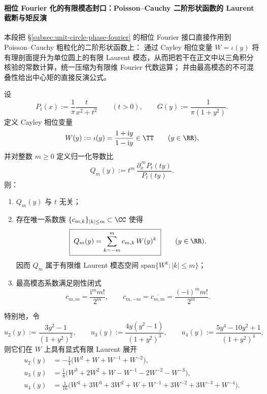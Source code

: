 \paragraph{相位 Fourier 化的有限模态封口：Poisson--Cauchy 二阶形状函数的 Laurent 截断与矩反演}\label{para:cdim-poisson-cauchy-phase-fourierization}
本段把 \S\ref{subsec:unit-circle-phase-fourier} 的相位 Fourier 接口直接作用到 Poisson--Cauchy 粗粒化的二阶形状函数上：
通过 Cayley 相位变量 \(W=\iota(y)\) 将有理剖面提升为单位圆上的有限 Laurent 模态，从而把若干在正文中以三角积分核验的常数计算，统一压缩为有限维 Fourier 代数运算；
并由最高模态的不可混叠性给出中心矩的直接反演公式。

\begin{proposition}\label{prop:cdim-poisson-cauchy-finite-laurent-modes}
设
\[
P_t(x):=\frac{1}{\pi}\frac{t}{x^2+t^2}\qquad(t>0),
\qquad
G(y):=\frac{1}{\pi(1+y^2)}.
\]
定义 Cayley 相位变量
\[
W(y):=\iota(y)=\frac{1+\mathrm{i}y}{1-\mathrm{i}y}\in\TT
\qquad(y\in\RR),
\]
并对整数 \(m\ge 0\) 定义归一化导数比
\[
Q_m(y):=t^m\,\frac{\partial_x^{\,m}P_t(ty)}{P_t(ty)}.
\]
则：
\begin{enumerate}
  \item \(Q_m(y)\) 与 \(t\) 无关；
  \item 存在唯一系数族 \(\{c_{m,k}\}_{|k|\le m}\subset\CC\) 使得
  \[
  \boxed{\;
  Q_m(y)=\sum_{k=-m}^{m}c_{m,k}\,W(y)^k\;}
  \qquad(y\in\RR),
  \]
  因而 \(Q_m\) 属于有限维 Laurent 模态空间 \(\mathrm{span}\{W^k:|k|\le m\}\)；
  \item 最高模态系数满足刚性闭式
  \[
  c_{m,m}=\frac{\mathrm{i}^{m}m!}{2^{m}},
  \qquad
  c_{m,-m}=\overline{c_{m,m}}=\frac{(-\mathrm{i})^{m}m!}{2^{m}}.
  \]
\end{enumerate}
特别地，令
\[
u_2(y):=\frac{3y^2-1}{(1+y^2)^2},\qquad
u_3(y):=\frac{4y(y^2-1)}{(1+y^2)^3},\qquad
u_4(y):=\frac{5y^4-10y^2+1}{(1+y^2)^4},
\]
则它们在 \(W\) 上具有显式有限 Laurent 展开
\begin{align}
u_2(y)
&=-\frac14\bigl(W^2+W+W^{-1}+W^{-2}\bigr),\label{eq:cdim-poisson-u2-laurent}\\
u_3(y)
&=\frac{\mathrm{i}}{8}\bigl(W^3+2W^2+W-W^{-1}-2W^{-2}-W^{-3}\bigr),\label{eq:cdim-poisson-u3-laurent}\\
u_4(y)
&=\frac1{16}\bigl(W^4+3W^3+3W^2+W+W^{-1}+3W^{-2}+3W^{-3}+W^{-4}\bigr).\label{eq:cdim-poisson-u4-laurent}
\end{align}
\end{proposition}
